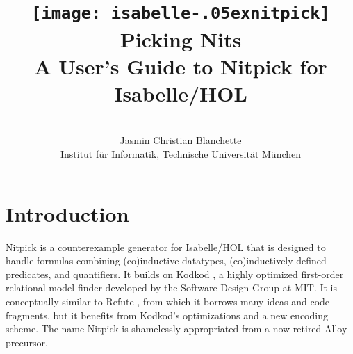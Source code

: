 \documentclass[a4paper,12pt]{article}
\renewcommand\_{\hbox{\textunderscore\kern-.05ex}}
\begin{document}
\renewcommand\labelitemi{\raise.065ex\hbox{\small\textbullet}}

\title{\texttt{[image: isabelle\_nitpick]} \\[4ex]
Picking Nits \\[\smallskipamount]
\Large A User's Guide to Nitpick for Isabelle/HOL}
\author{\hbox{} \\
Jasmin Christian Blanchette \\
{\normalsize Institut f\"ur Informatik, Technische Universit\"at M\"unchen} \\
\hbox{}}

\maketitle

\tableofcontents

\setlength{\parskip}{.7em plus .2em minus .1em}
\setlength{\parindent}{0pt}
\setlength{\abovedisplayskip}{\parskip}
\setlength{\abovedisplayshortskip}{.9\parskip}
\setlength{\belowdisplayskip}{\parskip}
\setlength{\belowdisplayshortskip}{.9\parskip}

\newenvironment{enum}%
    {\begin{list}{}{%
        \setlength{\topsep}{.1\parskip}%
        \setlength{\partopsep}{.1\parskip}%
        \setlength{\itemsep}{\parskip}%
        \advance\itemsep by-\parsep}}
    {\end{list}}

\def\pre{\begingroup\vskip0pt plus1ex\advance\leftskip by\leftmargin
\advance\rightskip by\leftmargin}
\def\post{\vskip0pt plus1ex\endgroup}

\def\prew{\pre\advance\rightskip by-\leftmargin}
\def\postw{\post}

\section{Introduction}
\label{introduction}

Nitpick \cite{blanchette-nipkow-2010} is a counterexample generator for
Isabelle/HOL \cite{isa-tutorial} that is designed to handle formulas
combining (co)in\-duc\-tive datatypes, (co)in\-duc\-tively defined predicates, and
quantifiers. It builds on Kodkod \cite{torlak-jackson-2007}, a highly optimized
first-order relational model finder developed by the Software Design Group at
MIT. It is conceptually similar to Refute \cite{weber-2008}, from which it
borrows many ideas and code fragments, but it benefits from Kodkod's
optimizations and a new encoding scheme. The name Nitpick is shamelessly
appropriated from a now retired Alloy precursor.
\end{document}
